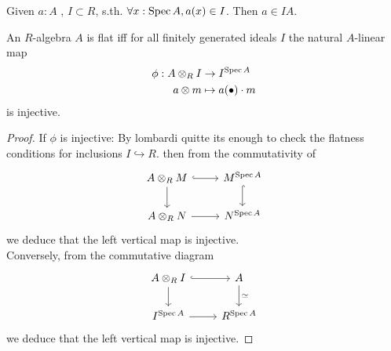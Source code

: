 \begin{lemma}
	Given $a : A$ , $I \subset R$, s.th. $\forall x : \operatorname{Spec} A , a(x) \in I$. Then $a \in IA$.
\end{lemma}
\begin{prop}
	An $R$-algebra $A$ is flat iff for all finitely generated ideals $I$ the natural $A$-linear map
	\begin{align*}
		\phi: A \otimes_R I &\to I^{\operatorname{Spec} A} \\
		a \otimes m &\mapsto a(\bullet) \cdot m
	\end{align*}
	is injective.
\end{prop}
\begin{proof}
	
	If $\phi$ is injective: By lombardi quitte its enough to check the flatness conditions for inclusions $I \hookrightarrow R$. then from the commutativity of
	\[\begin{tikzcd}
		{A \otimes_R M} & {M^{\Spec A}} \\
		{A \otimes_R N} & {N^{\Spec A}}
		\arrow[hook, from=1-1, to=1-2]
		\arrow[from=1-1, to=2-1]
		\arrow[hook, from=1-2, to=2-2]
		\arrow[from=2-1, to=2-2]
	\end{tikzcd}\]
	we deduce that the left vertical map is injective. \\
	Conversely, from the commutative diagram %
	\[\begin{tikzcd}
		{A \otimes_R I} & A \\
		{I^{\Spec A}} & {R^{\Spec A}}
		\arrow[hook, from=1-1, to=1-2]
		\arrow[from=1-1, to=2-1]
		\arrow["\simeq", from=1-2, to=2-2]
		\arrow[from=2-1, to=2-2]
	\end{tikzcd}\]
	we deduce that the left vertical map is injective.
	
	
\end{proof}
